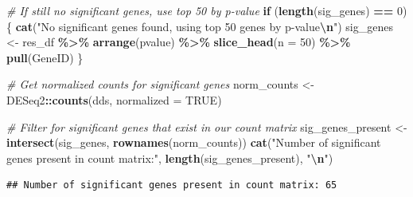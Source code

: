 \documentclass[
]{article}
\newenvironment{Shaded}{\begin{snugshade}}{\end{snugshade}}
\newcommand{\AttributeTok}[1]{\textcolor[rgb]{0.13,0.29,0.53}{#1}}
\newcommand{\CommentTok}[1]{\textcolor[rgb]{0.56,0.35,0.01}{\textit{#1}}}
\newcommand{\ConstantTok}[1]{\textcolor[rgb]{0.56,0.35,0.01}{#1}}
\newcommand{\ControlFlowTok}[1]{\textcolor[rgb]{0.13,0.29,0.53}{\textbf{#1}}}
\newcommand{\DecValTok}[1]{\textcolor[rgb]{0.00,0.00,0.81}{#1}}
\newcommand{\FunctionTok}[1]{\textcolor[rgb]{0.13,0.29,0.53}{\textbf{#1}}}
\newcommand{\NormalTok}[1]{#1}
\newcommand{\OtherTok}[1]{\textcolor[rgb]{0.56,0.35,0.01}{#1}}
\newcommand{\SpecialCharTok}[1]{\textcolor[rgb]{0.81,0.36,0.00}{\textbf{#1}}}
\newcommand{\StringTok}[1]{\textcolor[rgb]{0.31,0.60,0.02}{#1}}
\begin{document}
\begin{Shaded}
\begin{Highlighting}[]
\CommentTok{\# If still no significant genes, use top 50 by p{-}value}
\ControlFlowTok{if}\NormalTok{ (}\FunctionTok{length}\NormalTok{(sig\_genes) }\SpecialCharTok{==} \DecValTok{0}\NormalTok{) \{}
  \FunctionTok{cat}\NormalTok{(}\StringTok{"No significant genes found, using top 50 genes by p{-}value}\SpecialCharTok{\textbackslash{}n}\StringTok{"}\NormalTok{)}
\NormalTok{  sig\_genes }\OtherTok{\textless{}{-}}\NormalTok{ res\_df }\SpecialCharTok{\%\textgreater{}\%}
    \FunctionTok{arrange}\NormalTok{(pvalue) }\SpecialCharTok{\%\textgreater{}\%}
    \FunctionTok{slice\_head}\NormalTok{(}\AttributeTok{n =} \DecValTok{50}\NormalTok{) }\SpecialCharTok{\%\textgreater{}\%}
    \FunctionTok{pull}\NormalTok{(GeneID)}
\NormalTok{\}}

\CommentTok{\# Get normalized counts for significant genes}
\NormalTok{norm\_counts }\OtherTok{\textless{}{-}}\NormalTok{ DESeq2}\SpecialCharTok{::}\FunctionTok{counts}\NormalTok{(dds, }\AttributeTok{normalized =} \ConstantTok{TRUE}\NormalTok{)}

\CommentTok{\# Filter for significant genes that exist in our count matrix}
\NormalTok{sig\_genes\_present }\OtherTok{\textless{}{-}} \FunctionTok{intersect}\NormalTok{(sig\_genes, }\FunctionTok{rownames}\NormalTok{(norm\_counts))}
\FunctionTok{cat}\NormalTok{(}\StringTok{"Number of significant genes present in count matrix:"}\NormalTok{, }\FunctionTok{length}\NormalTok{(sig\_genes\_present), }\StringTok{"}\SpecialCharTok{\textbackslash{}n}\StringTok{"}\NormalTok{)}
\end{Highlighting}
\end{Shaded}

\begin{verbatim}
## Number of significant genes present in count matrix: 65
\end{verbatim}
\end{document}
